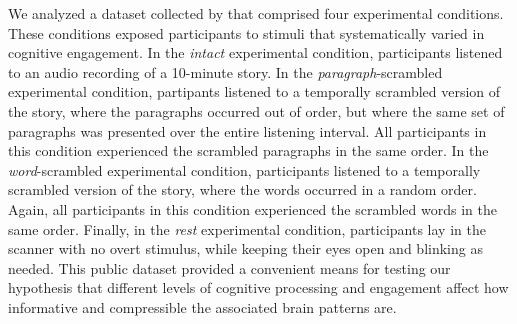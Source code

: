 \documentclass[english, 11pt]{article}
\begin{document}
We analyzed a dataset collected by \cite{SimoEtal16} that comprised four
experimental conditions. These conditions exposed participants to stimuli that
systematically varied in cognitive engagement. In the \textit{intact}
experimental condition, participants listened to an audio recording of a
10-minute story. In the \textit{paragraph}-scrambled experimental condition,
partipants listened to a temporally scrambled version of the story, where the
paragraphs occurred out of order, but where the same set of paragraphs was
presented over the entire listening interval. All participants in this
condition experienced the scrambled paragraphs in the same order. In the
\textit{word}-scrambled experimental condition, participants listened to a
temporally scrambled version of the story, where the words occurred in a random
order. Again, all participants in this condition experienced the scrambled
words in the same order. Finally, in the \textit{rest} experimental condition,
participants lay in the scanner with no overt stimulus, while keeping their
eyes open and blinking as needed. This public dataset provided a convenient
means for testing our hypothesis that different levels of cognitive processing
and engagement affect how informative and compressible the associated brain
patterns are.
\end{document}
